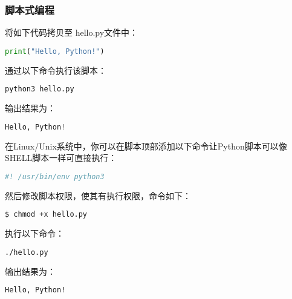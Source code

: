 \subsubsection{脚本式编程}

将如下代码拷贝至 hello.py文件中：

\begin{lstlisting}[language=python]
print("Hello, Python!")
\end{lstlisting}

通过以下命令执行该脚本：

\begin{lstlisting}[language=bash]
python3 hello.py
\end{lstlisting}

输出结果为：

\begin{lstlisting}[language=python]
Hello, Python!
\end{lstlisting}

在Linux/Unix系统中，你可以在脚本顶部添加以下命令让Python脚本可以像SHELL脚本一样可直接执行：

\begin{lstlisting}[language=python]
#! /usr/bin/env python3
\end{lstlisting}

然后修改脚本权限，使其有执行权限，命令如下：

\begin{lstlisting}[language=bash]
$ chmod +x hello.py
\end{lstlisting}

执行以下命令：

\begin{lstlisting}[language=bash]
./hello.py
\end{lstlisting}

输出结果为：

\begin{lstlisting}[language=bash]
Hello, Python!
\end{lstlisting}
